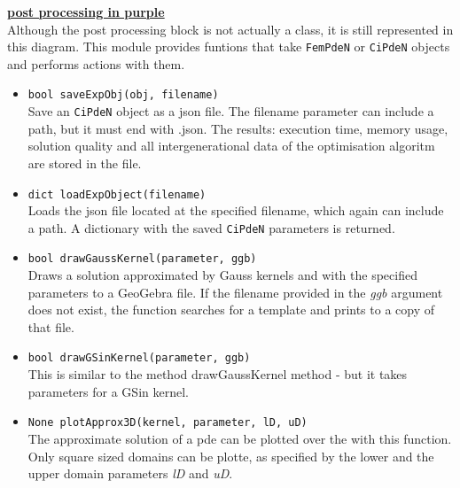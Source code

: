 \documentclass[./\jobname.tex]{subfiles}
\begin{document}
\textcolor{post_proc_colour}{\large \underline{\textbf{post processing in purple}}} \\
Although the post processing block is not actually a class, it is still represented in this diagram. This module provides funtions that take \colorbox{light-gray}{\lstinline[basicstyle=\ttfamily\color{black}]|FemPdeN|} or \colorbox{light-gray}{\lstinline[basicstyle=\ttfamily\color{black}]|CiPdeN|} objects and performs actions with them. 

\begin{itemize}
	\item \colorbox{light-gray}{\lstinline[basicstyle=\ttfamily\color{black}]|bool saveExpObj(obj, filename)|} \\
	Save an \colorbox{light-gray}{\lstinline[basicstyle=\ttfamily\color{black}]|CiPdeN|} object as a \gls{json} file. The filename parameter can include a path, but it must end with .json. The results: execution time, memory usage, solution quality and all intergenerational data of the optimisation algoritm are stored in the file. 
	\item \colorbox{light-gray}{\lstinline[basicstyle=\ttfamily\color{black}]|dict loadExpObject(filename)|} \\
	Loads the \gls{json} file located at the specified filename, which again can include a path. A dictionary with the saved \colorbox{light-gray}{\lstinline[basicstyle=\ttfamily\color{black}]|CiPdeN|} parameters is returned. 
	\item \colorbox{light-gray}{\lstinline[basicstyle=\ttfamily\color{black}]|bool drawGaussKernel(parameter, ggb)|} \\
	Draws a solution approximated by Gauss kernels and with the specified parameters to a GeoGebra file. If the filename provided in the \textit{ggb} argument does not exist, the function searches for a template and prints to a copy of that file. 
	\item \colorbox{light-gray}{\lstinline[basicstyle=\ttfamily\color{black}]|bool drawGSinKernel(parameter, ggb)|} \\
	This is similar to the method drawGaussKernel method - but it takes parameters for a GSin kernel. 
	\item 
	\colorbox{light-gray}{\lstinline[basicstyle=\ttfamily\color{black}]|None plotApprox3D(kernel, parameter, lD, uD)|} \\
	The approximate solution of a \gls{pde} can be plotted over the with this function. Only square sized domains can be plotte, as specified by the lower and the upper domain parameters \textit{lD} and \textit{uD}. 
\end{itemize}
\end{document}
